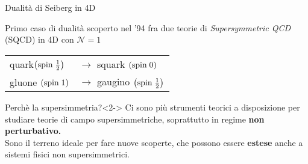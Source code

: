 \documentclass[10pt,compress,usenames,dvipsnames]{beamer}
\begin{document}
\begin{frame}{Dualità di Seiberg in 4D}

Primo caso di dualità scoperto nel '94 fra due teorie di \emph{Supersymmetric QCD} (SQCD) in 4D con $\mathcal{N}=1$ 
\begin{table}
\begin{tabular}{l l}
quark$\left (\hbox{spin} \;  \frac{1}{2} \right)$ \quad & $\longrightarrow$ \quad squark $\left( \hbox{spin} \;  0 \right)$  \\
 gluone  $\left( \hbox{spin} \;  1 \right)$ \quad &  $\longrightarrow$ \quad gaugino $\left (\hbox{spin} \;  \frac{1}{2} \right)$  \\
\end{tabular}
\end{table}

\begin{block}{Perchè la supersimmetria?}<2->
Ci sono più strumenti teorici a disposizione per studiare teorie di campo supersimmetriche,
soprattutto in regime \alert{\bfseries non perturbativo.} \\
\vspace{0.2cm}
Sono il terreno ideale per fare nuove scoperte, che possono essere \alert{\bfseries estese} anche a sistemi fisici non supersimmetrici.

\end{block}


\end{frame}
\end{document}
